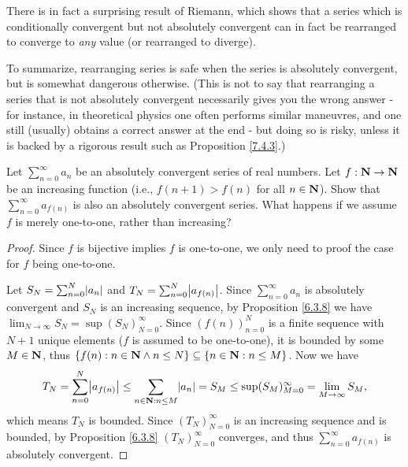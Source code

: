 \begin{note}
    There is in fact a surprising result of Riemann, which shows that a series which is conditionally convergent but not absolutely convergent can in fact be rearranged to converge to \emph{any} value
    (or rearranged to diverge).
\end{note}

\begin{note}
    To summarize, rearranging series is safe when the series is absolutely convergent, but is somewhat dangerous otherwise.
    (This is not to say that rearranging a series that is not absolutely convergent necessarily gives you the wrong answer
    - for instance, in theoretical physics one often performs similar maneuvres, and one still (usually) obtains a correct answer at the end
    - but doing so is risky, unless it is backed by a rigorous result such as Proposition \ref{7.4.3}.)
\end{note}

\exercisesection

\begin{exercise}\label{ex 7.4.1}
    Let \(\sum_{n = 0}^\infty a_n\) be an absolutely convergent series of real numbers.
    Let \(f : \mathbf{N} \to \mathbf{N}\) be an increasing function (i.e., \(f(n + 1) > f(n)\) for all \(n \in \mathbf{N}\)).
    Show that \(\sum_{n = 0}^\infty a_{f(n)}\) is also an absolutely convergent series.
    What happens if we assume \(f\) is merely one-to-one, rather than increasing?
\end{exercise}

\begin{proof}
    Since \(f\) is bijective implies \(f\) is one-to-one, we only need to proof the case for \(f\) being one-to-one.

    Let \(S_N = \sum_{n = 0}^N \abs{a_n}\) and \(T_N = \sum_{n = 0}^N \abs{a_{f(n)}}\).
    Since \(\sum_{n = 0}^\infty a_n\) is absolutely convergent and \(S_N\) is an increasing sequence, by Proposition \ref{6.3.8} we have \(\lim_{N \to \infty} S_N = \sup(S_N)_{N = 0}^\infty\).
    Since \((f(n))_{n = 0}^N\) is a finite sequence with \(N + 1\) unique elements (\(f\) is assumed to be one-to-one), it is bounded by some \(M \in \mathbf{N}\), thus \(\{f(n) : n \in \mathbf{N} \land n \leq N\} \subseteq \{n \in \mathbf{N} : n \leq M\}\).
    Now we have
    \[
        T_N = \sum_{n = 0}^N \abs{a_{f(n)}} \leq \sum_{n \in \N : n \leq M} \abs{a_n} = S_M \leq \sup(S_M)_{M = 0}^\infty = \lim_{M \to \infty} S_M,
    \]
    which means \(T_N\) is bounded.
    Since \((T_N)_{N = 0}^\infty\) is an increasing sequence and is bounded, by Proposition \ref{6.3.8} \((T_N)_{N = 0}^\infty\) converges, and thus \(\sum_{n = 0}^\infty a_{f(n)}\) is absolutely convergent.
\end{proof}


